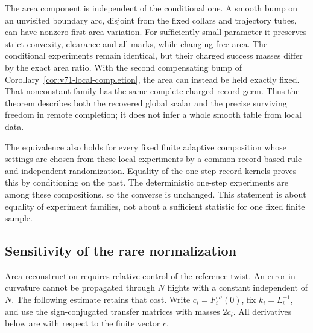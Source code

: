 The area component is independent of the conditional one.  A smooth bump
on an unvisited boundary arc, disjoint from the fixed collars and trajectory
tubes, can have nonzero first area variation.  For sufficiently small
parameter it preserves strict convexity, clearance and all marks, while
changing free area.  The conditional experiments remain identical, but
their charged success masses differ by the exact area ratio.  With the
second compensating bump of Corollary~\ref{cor:v71-local-completion},
the area can instead be held exactly fixed.  That nonconstant family
has the same complete charged-record germ.  Thus the theorem describes
both the recovered global scalar and the precise surviving freedom in
remote completion; it does not infer a whole smooth table from local data.

The equivalence also holds for every fixed finite adaptive composition
whose settings are chosen from these local experiments by a common
record-based rule and independent randomization.  Equality of the one-step
record kernels proves this by conditioning on the past.  The deterministic
one-step experiments are among these compositions, so the converse is
unchanged.  This statement is about equality of experiment families, not
about a sufficient statistic for one fixed finite sample.

\subsection{Sensitivity of the rare normalization}

Area reconstruction requires relative control of the reference twist.
An error in curvature cannot be propagated through $N$ flights with a
constant independent of $N$.  The following estimate retains that cost.
Write $c_i=F_i''(0)$, fix $k_i=L_i^{-1}$, and use the sign-conjugated
transfer matrices with masses $2c_i$.  All derivatives below are with
respect to the finite vector $c$.

